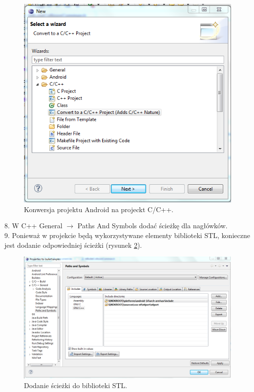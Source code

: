 \newpage
\begin{figure}[H]
\centering
\includegraphics[scale=1]{./img/convert.png}
\caption{Konwersja projektu Android na projeckt C/C++.}
\label{fig:AndroidConversion}
\end{figure}

8. W C++ General $ \rightarrow $ Paths And Symbols dodać ścieżkę dla
nagłówków.\\
 
9. Ponieważ w projekcie będą wykorzystywane elementy biblioteki STL,
konieczne jest dodanie odpowiedniej ścieżki (rysunek \ref{fig:StlPath}).\\

\begin{figure}[h]
\centering
\includegraphics[width=\textwidth]{./img/ndkroot.png}
\caption{Dodanie ścieżki do biblioteki STL.}
\label{fig:StlPath}
\end{figure}
  
